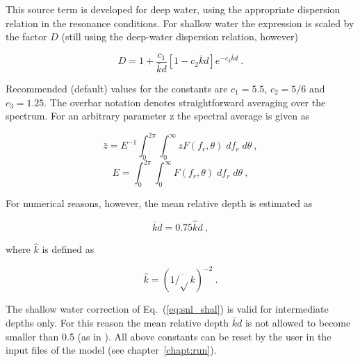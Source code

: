 This source term is developed for deep water, using the appropriate dispersion
relation in the resonance conditions. For shallow water the expression is
scaled by the factor $D$ (still using the deep-water dispersion relation,
however)


\begin{equation}
D = 1 + \frac{c_1}{\bar{k}d} \left [ 1 - c_2 \bar{k} d
\right ] e^{-c_3 \bar{k} d} \: . \label{eq:snl_shal}
\end{equation}

\noindent
Recommended (default) values for the constants are \citep{art:Hea85a}
$c_1=5.5$, $c_2=5/6$ and $c_3=1.25$. The overbar notation denotes
straightforward averaging over the spectrum. For an arbitrary parameter z the
spectral average is given as


\begin{equation}
\bar{z} = E^{-1} \int_{0}^{2\pi} \int_{0}^{\infty}
z F(f_r,\theta) \; d f_r \; d\theta \: , \label{eq:zbar}
\end{equation}
\begin{equation}
E = \int_{0}^{2\pi} \int_{0}^{\infty}
F(f_r,\theta) \; d f_r \; d\theta \: , \label{eq:etot}
\end{equation}

\noindent
For numerical reasons, however, the mean relative depth is estimated as


\begin{equation}
\bar{k} d = 0.75 \hat{k} d \: , \label{eq:kd_num}
\end{equation}

\noindent
where $\hat{k}$ is defined as

\begin{equation}
\hat{k} = \left ( \overline{1/\sqrt{}k} \right )^{-2} \: .
\label{eq:k_hat}
\end{equation}

\noindent
The shallow water correction of Eq.~(\ref{eq:snl_shal}) is valid for
intermediate depths only. For this reason the mean relative depth $\bar{k}d$
is not allowed to become smaller than 0.5 (as in \wam). All above constants
can be reset by the user in the input files of the model (see
chapter~\ref{chapt:run}).


